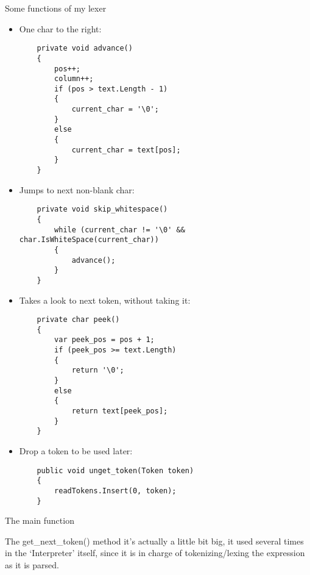    \newpage
    \begin{center}
        \centering
        Some functions of my lexer
    \end{center}
\begin{itemize}
    \item One char to the right:
    \begin{lstlisting}
    private void advance()
    {
        pos++;
        column++;
        if (pos > text.Length - 1)
        {
            current_char = '\0';
        }
        else
        {
            current_char = text[pos];
        }
    }
    \end{lstlisting}
    \item Jumps to next non-blank char:
    \begin{lstlisting}
    private void skip_whitespace()
    {
        while (current_char != '\0' && char.IsWhiteSpace(current_char))
        {
            advance();
        }
    }
    \end{lstlisting}
    \item Takes a look to next token, without taking it:
    \begin{lstlisting}
    private char peek()
    {
        var peek_pos = pos + 1;
        if (peek_pos >= text.Length)
        {
            return '\0';
        }
        else
        {
            return text[peek_pos];
        }
    }
    \end{lstlisting}
    \item Drop a token to be used later:
    \begin{lstlisting}
    public void unget_token(Token token)
    {
        readTokens.Insert(0, token);
    }
    \end{lstlisting}
\end{itemize}

\begin{center}
    \centering
    The main function
\end{center}
The \hbox{get\_next\_token{()}} method it's actually a little bit big, it used several times in the `Interpreter' itself, since it is in charge of tokenizing/lexing the expression as it is parsed.